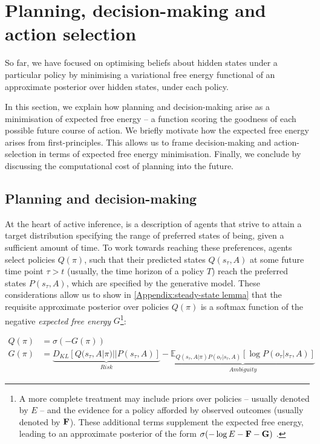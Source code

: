 \documentclass[review,12pt,authoryear]{elsarticle}
\begin{document}
\section{Planning, decision-making and action selection}

So far, we have focused on optimising beliefs about hidden states under a particular policy by minimising a variational free energy functional of an approximate posterior over hidden states, under each policy.

In this section, we explain how planning and decision-making arise as a minimisation of expected free energy -- a function scoring the goodness of each possible future course of action. We briefly motivate how the expected free energy arises from first-principles. This allows us to frame decision-making and action-selection in terms of expected free energy minimisation. Finally, we conclude by discussing the computational cost of planning into the future.

\subsection{Planning and decision-making}

At the heart of active inference, is a description of agents that strive to attain a target distribution specifying the range of preferred states of being, given a sufficient amount of time. To work towards reaching these preferences, agents select policies $Q(\pi)$, such that their predicted states $Q(s_\tau,A)$ at some future time point $\tau > t$ (usually, the time horizon of a policy $T$) reach the preferred states $P(s_\tau,A)$, which are specified by the generative model. These considerations allow us to show in \ref{Appendix:steady-state lemma} that the requisite approximate posterior over policies $Q(\pi)$ is a softmax function of the negative \textit{expected free energy} $G$\footnote{A more complete treatment may include priors over policies – usually denoted by $E$ – and the evidence for a policy afforded by observed outcomes (usually denoted by $\bold F$). These additional terms supplement the expected free energy, leading to an approximate posterior of the form $\sigma (- \log E - \bold F - \bold G)$ \citep{fristonDeepTemporalModels2018}.}:

\begin{equation}
\label{eq: approx post policies}
\begin{split}
   Q(\pi) &=\sigma(-G(\pi)) \\
   G(\pi) &= \underbrace{ D_{KL}[Q(s_\tau, A|\pi)||P(s_\tau, A)]}_{Risk}- \underbrace{\mathbb E_{Q(s_\tau, A|\pi)P(o_\tau|s_\tau, A)}[ \log P(o_\tau |s_\tau, A)]}_{Ambiguity}
\end{split}
\end{equation}
\end{document}
